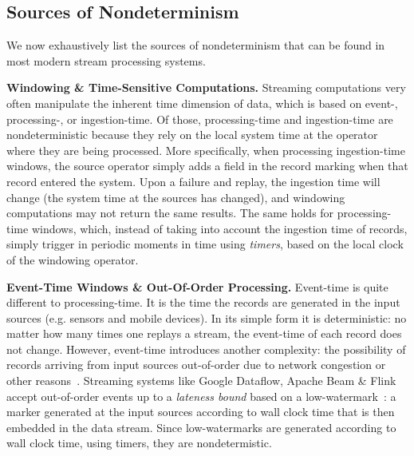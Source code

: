 \documentclass[sigconf]{acmart}
\newcommand{\para}[1]{\vspace{1mm}\noindent\textbf{#1.}}
\begin{document}
\subsection{Sources of Nondeterminism}
\label{sub:nondeterminism}

We now exhaustively list the sources of nondeterminism that can be found in most modern stream processing systems. 

\para{Windowing \& Time-Sensitive Computations} Streaming computations very often manipulate the inherent time dimension of data, which is based on event-, processing-, or ingestion-time. Of those, processing-time and ingestion-time are nondeterministic because they rely on the local system time at the operator where they are being processed. More specifically, when processing ingestion-time windows, the source operator simply adds a field in the record marking when that record entered the system.  Upon a failure and replay, the ingestion time will change (the system time at the sources has changed), and windowing computations may not return the same results. The same holds for processing-time windows, which, instead of taking into account the ingestion time of records, simply trigger in periodic moments in time using \textit{timers}, based on the local clock of the windowing operator.




\para{Event-Time Windows \& Out-Of-Order Processing} Event-time is quite different to processing-time. It is the time the records are generated in the input sources (e.g. sensors and mobile devices). In its simple form it is deterministic: no matter how many times one replays a stream, the event-time of each record does not change. However, event-time introduces another complexity: the possibility of records arriving from input sources out-of-order due to network congestion or other reasons~\cite{srivastava2004flexible}. Streaming systems like Google Dataflow, Apache Beam \& Flink accept out-of-order events up to a \emph{lateness bound} based on a low-watermark~\cite{li2008out}: a marker generated  at the input sources according to wall clock time that is then embedded in the data stream. 
Since low-watermarks are generated according to wall clock time, using timers, they are nondetermistic.
\end{document}
